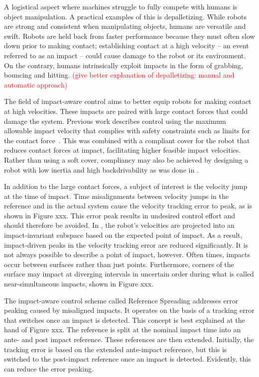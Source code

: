 \documentclass[a4paper, 10pt, conference]{ieeeconf}
\begin{document}
    A logistical aspect where machines struggle to fully compete with humans is object manipulation. A practical examples of this is depalletizing. While robots are strong and consistent when manipulating objects, humans are versatile and swift. Robots are held back from faster performance because they must often slow down prior to making contact; establishing contact at a high velocity -- an event referred to as an impact -- could cause damage to the robot or its environment. On the contrary, humans intrinsically exploit impacts in the form of grabbing, bouncing and hitting. \textcolor{red}{(give better explanation of depalletizing: manual and automatic approach)}

    The field of impact-aware control aims to better equip robots for making contact at high velocities. These impacts are paired with large contact forces that could damage the system. Previous work describes control using the maximum allowable impact velocity that complies with safety constraints such as limits for the contact force~\cite{dehioRobotSafeImpactsSoft2021, dehioDualArmBoxGrabbing2022}. This was combined with a compliant cover for the robot that reduces contact forces at impact, facilitating higher feasible impact velocities. Rather than using a soft cover, compliancy may also be achieved by designing a robot with low inertia and high backdrivability as was done in \cite{songDevelopmentLowInertiaHighStiffness2018}.

    In addition to the large contact forces, a subject of interest is the velocity jump at the time of impact. Time misalignments between velocity jumps in the reference and in the actual system cause the velocity tracking error to peak\cite{biemondTrackingControlMechanical2012}, as is shown in Figure xxx. This error peak results in undesired control effort and should therefore be avoided. In \cite{yangImpactInvariantControl2021}, the robot's velocities are projected into an impact-invariant subspace based on the expected point of impact. As a result, impact-driven peaks in the velocity tracking error are reduced significantly. It is not always possible to describe a point of impact, however. Often times, impacts occur between surfaces rather than just points. Furthermore, corners of the surface may impact at diverging intervals in uncertain order during what is called near-simultaneous impacts, shown in Figure xxx.

    The impact-aware control scheme called Reference Spreading \cite{sacconSensitivityAnalysisHybrid2014} addresses error peaking caused by misaligned impacts. It operates on the basis of a tracking error that switches once an impact is detected. This concept is best explained at the hand of Figure xxx. The reference is split at the nominal impact time into an ante- and post impact reference. These references are then extended. Initially, the tracking error is based on the extended ante-impact reference, but this is switched to the post-impact reference once an impact is detected. Evidently, this can reduce the error peaking.
\end{document}
